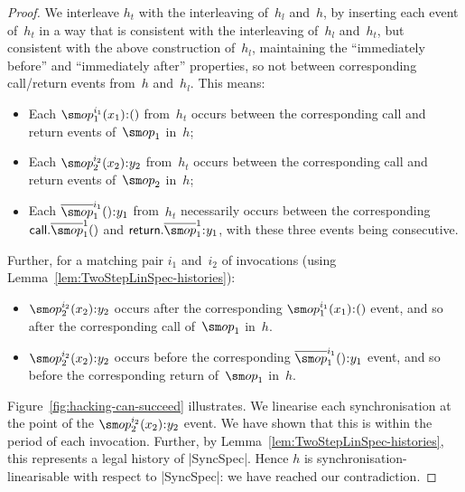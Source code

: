 \begin{proof}
We interleave $h_t$ with the interleaving of~$h_l$ and~$h$, by inserting each
event of~$h_t$ in a way that is consistent with the interleaving of~$h_l$
and~$h_t$, but consistent with the above construction of~$h_l$, maintaining
the ``immediately before'' and ``immediately after'' properties, so not
between corresponding call/return events from~$h$ and~$h_l$.  This means:
%
\begin{itemize}
\item Each $\op_1^{i_1}(x_1)\::()$ from~$h_t$ occurs between the corresponding
  call and return events of~$\op_1$ in~$h$;

\item Each $\op_2^{i_2}(x_2)\::y_2$ from~$h_t$ occurs between the
  corresponding call and return events of~$\op_2$ in~$h$;

\item Each $\overline{\op}_1^{i_1}()\::y_1$ from~$h_t$ necessarily occurs
  between the corresponding $\call.\overline{\op}_1^1()$ and
  $\return.\overline{\op}_1^1\::y_1$, with these three events being
  consecutive.
\end{itemize}
%
Further, for a matching pair $i_1$ and~$i_2$ of invocations (using
Lemma~\ref{lem:TwoStepLinSpec-histories}):
%
\begin{itemize}
\item $\op_2^{i_2}(x_2)\::y_2$ occurs after the corresponding
  $\op_1^{i_1}(x_1)\::()$ event, and so after the corresponding call
  of~$\op_1$ in~$h$.

\item $\op_2^{i_2}(x_2)\::y_2$ occurs before the corresponding
  $\overline\op_1^{i_1}()\::y_1$ event, and so before the corresponding return
  of~$\op_1$ in~$h$.
\end{itemize}
%
Figure~\ref{fig:hacking-can-succeed} illustrates.  We linearise each
synchronisation at the point of the $\op_2^{i_2}(x_2)\::y_2$ event.  We have
shown that this is within the period of each invocation.  Further, by
Lemma~\ref{lem:TwoStepLinSpec-histories}, this represents a legal history of
|SyncSpec|.  Hence $h$ is synchronisation-linearisable with respect to
|SyncSpec|: we have reached our contradiction.
\end{proof}


